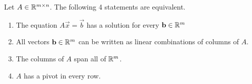 \documentclass[xcoler=dvipsnames, aspectratio=169]{beamer}
\begin{document}
    \begin{frame}
        \begin{theorem}
            Let $A\in\mathbb{R}^{m\times n}$. The following 4 statements are equivalent.
            \begin{enumerate}
                \item The equation $A\vec{x}=\vec{b}$ has a solution for every $\mathbf{b}\in\mathbb{R}^m$
                \item All vectors $\mathbf{b}\in\mathbb{R}^m$ can be written as linear combinations of columns
                    of $A$.
                \item The columns of $A$ span all of $\mathbb{R}^m$.
                \item $A$ has a pivot in every row.
            \end{enumerate}
        \end{theorem}
    \end{frame}
\end{document}
